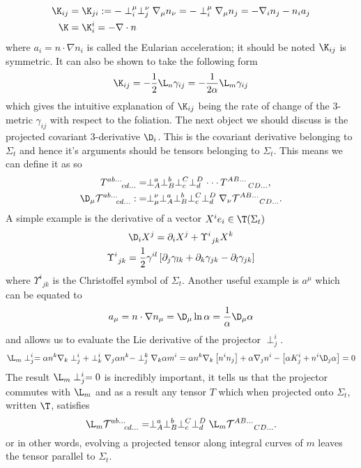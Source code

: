 \begin{align} \K_{ij}  &= \K_{ji}:= -\perp_i^\mu \perp_j^\nu \nabla_\mu n_\nu = -\perp_i^\mu \nabla_\mu n_j = -\nabla_i n_j - n_i a_j \\
\K &= \K_i^i = -\nabla \cdot n\end{align}
where $a_i = n\cdot\nabla n_i $ is called the Eularian acceleration; it should be noted $\K_{ij}$ is symmetric. It can also be shown to take the following form
\begin{equation} \K_{ij} = -\frac{1}{2}\L_n \gamma_{ij} = -\frac{1}{2\alpha}\L_m \gamma_{ij}\end{equation}
which gives the intuitive explanation of $\K_{ij}$ being the rate of change of the 3-metric $\gamma_{ij}$ with respect to the foliation. 
The next object we should discuss is the projected covariant 3-derivative $\D_i$. This is the covariant derivative belonging to $\Sigma_t$ and hence it's arguments should be tensors belonging to $\Sigma_t$. This means we can define it as so
\begin{align} {{T}}^{ab ...}_{\;\;\;\;\;\;\;cd ...} &=  \perp^{a}_{A}\perp^{b}_{B}\perp^{C}_{c}\perp^{D}_{d}\cdot\cdot\cdot\, T^{AB ...}_{\;\;\;\;\;\;\;\;\;\;CD ...},\\
  \D_\mu {{\mathcal{T}}}^{ab ...}_{\;\;\;\;\;\;\;cd ...} :&=   \perp^\nu_\mu  \perp^{a}_{A}\perp^{b}_{B}\perp^{C}_{c}\perp^{D}_{d} \nabla_\nu{\mathcal{T}}^{AB ...}_{\;\;\;\;\;\;\;\;\;\;CD ...}.\end{align}
A simple example is the derivative of a vector $X^i e_i \in \T(\Sigma_t)$
\begin{gather} \D_i X^j = \partial_i X^j + \Upsilon^i_{\;\,jk}X^k\nonumber\\
\Upsilon^i_{\;\,jk} = \frac{1}{2}\gamma^{il}\left[ \partial_{j}\gamma_{lk} + \partial_{k}\gamma_{jk} -\partial_{l}\gamma_{jk} \right]\end{gather}
where $\Upsilon^i_{\;\,jk}$ is the Christoffel symbol of $\Sigma_t$. Another useful example is $a^\mu$ which can be equated to
\[ a_\mu = n\cdot \nabla n_\mu = \D_\mu \ln \alpha = \frac{1}{\alpha}\D_\mu \alpha\]
and allows us to evaluate the Lie derivative of the projector $\perp^i_j$.
\begin{gather*}\L_m \perp^i_j = \alpha n^k \nabla_k \perp^i_j + \perp^i_k \nabla_j \alpha n^k - \perp^k_j \nabla_k \alpha m^i  = \alpha n^k \nabla_k \left[ n^i n_j\right]  + \alpha \nabla_j n^i - \left[ \alpha K_j^i + n^i \D_j \alpha\right] = 0\end{gather*}
The result $\L_m \perp^i_j=0$ is incredibly important, it tells us that the projector commutes with $\L_m$ and as a result any tensor $T$ which when projected onto $\Sigma_t$, written $\T$, satisfies
\begin{equation}  \L_m {{\mathcal{T}}}^{ab ...}_{\;\;\;\;\;\;\;cd ...} =   \perp^{a}_{A}\perp^{b}_{B}\perp^{C}_{c}\perp^{D}_{d}\L_m{\mathcal{T}}^{AB ...}_{\;\;\;\;\;\;\;\;\;\;CD ...}.\end{equation} 
or in other words, evolving a projected tensor along integral curves of $m$ leaves the tensor parallel to $\Sigma_t$.




